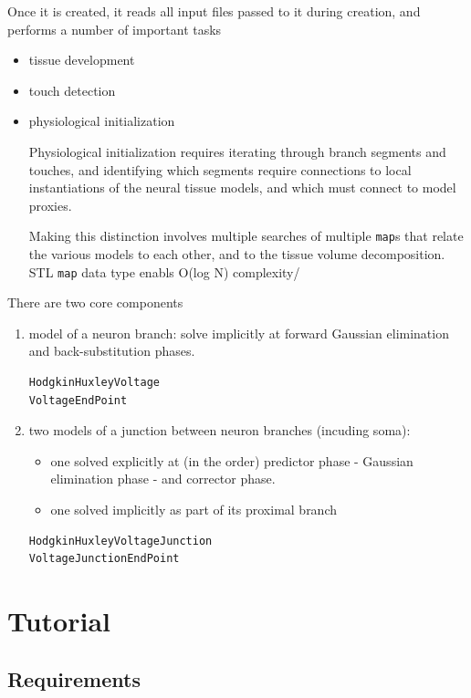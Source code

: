 Once it is created, it reads all input files passed to it during creation, and
performs a number of important tasks
\begin{itemize}
  \item tissue development
  \item touch detection
  \item physiological initialization
  
  Physiological initialization requires iterating through branch
segments and touches, and identifying which segments require
connections to local instantiations of the neural tissue models, and which must
connect to model proxies.

Making this distinction involves multiple searches of multiple \verb!map!s that
relate the various models to each other, and to the tissue volume
decomposition. STL \verb!map! data type enabls O(log N) complexity/
\end{itemize}

There are two core components
\begin{enumerate}
  \item model of a neuron branch: solve implicitly at 
  forward Gaussian elimination and back-substitution phases.
  
\begin{verbatim}
HodgkinHuxleyVoltage
VoltageEndPoint
\end{verbatim}

  \item two models of a junction between neuron branches (incuding soma): 
  \begin{itemize}
    \item   one solved explicitly at (in the order) predictor phase - Gaussian elimination
  phase - and corrector phase.
    \item one solved implicitly as part of its proximal branch
  \end{itemize}
   
\begin{verbatim}
HodgkinHuxleyVoltageJunction
VoltageJunctionEndPoint
\end{verbatim}
\end{enumerate}

\section{Tutorial}

\subsection{Requirements}

